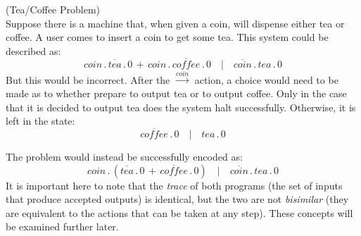     \begin{example*}{(Tea/Coffee Problem)\\}
        Suppose there is a machine that, when given a coin, will dispense either tea or coffee.
        A user comes to insert a coin to get some tea.
        This system could be described as:
        \begin{equation*}
            coin \, . \, \overline{tea} \, . \, 0 \, + \, coin \, . \, \overline{coffee} \, . \, 0 \quad | \quad \overline{coin} \, . \, tea \, . \, 0
        \end{equation*}
        But this would be incorrect.
        After the $\xrightarrow{coin}$ action, a choice would need to be made as to whether prepare to output tea or to output coffee.
        Only in the case that it is decided to output tea does the system halt successfully.
        Otherwise, it is left in the state:
        \begin{equation*}
            \overline{coffee} \, . \, 0 \quad | \quad tea \, . \, 0
        \end{equation*}
        
        The problem would instead be successfully encoded as:
        \begin{equation*}
            coin \, . \, (\overline{tea} \, . \, 0 \, + \, \overline{coffee} \, . \, 0) \quad | \quad \overline{coin} \, . \, tea \, . \, 0
        \end{equation*}
        It is important here to note that the \textit{trace} of both programs (the set of inputs that produce accepted outputs) is identical, but the two are not \textit{bisimilar} (they are equivalent to the actions that can be taken at any step).
        These concepts will be examined further later.
    \end{example*}


